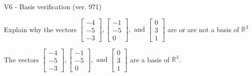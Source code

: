 \begin{exercise}
  \begin{exerciseTitle}V6 - Basis verification (ver. 971)\end{exerciseTitle}
  \begin{exerciseStatement}
    Explain why the vectors \(\left[\begin{array}{r}
-4 \\
-5 \\
-3
\end{array}\right] , \left[\begin{array}{r}
-1 \\
-5 \\
0
\end{array}\right] , \text{ and } \left[\begin{array}{r}
0 \\
3 \\
1
\end{array}\right]\) are or are not a basis of \(\mathbb{R}^3\)	


  \end{exerciseStatement}
  \begin{exerciseAnswer}
   The vectors \(\left[\begin{array}{r}
-4 \\
-5 \\
-3
\end{array}\right] , \left[\begin{array}{r}
-1 \\
-5 \\
0
\end{array}\right] , \text{ and } \left[\begin{array}{r}
0 \\
3 \\
1
\end{array}\right]\) 
  	 are  a basis of \(\mathbb{R}^3\).
  


  \end{exerciseAnswer}
\end{exercise}